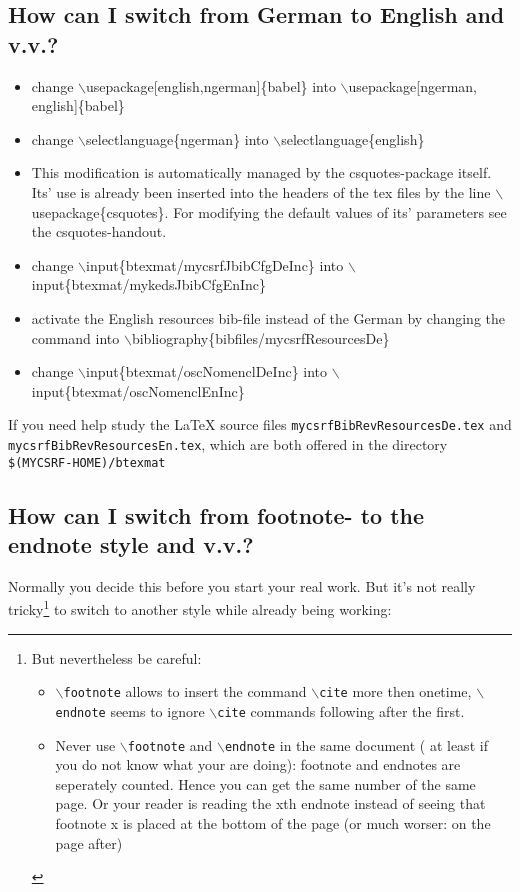 \documentclass[
  DIV=calc,
  BCOR=5mm,
  11pt,
  headings=small,
  oneside,
  abstract=true,
  toc=bib,
  ngerman,english]{scrartcl}
\begin{document}
\subsection{How can I switch from German to English and v.v.?}

\begin{itemize}
  \item change $\backslash$usepackage[english,ngerman]\{babel\} into
  $\backslash$usepackage[ngerman, english]\{babel\}
  \item change $\backslash$selectlanguage\{ngerman\} into 
  $\backslash$selectlanguage\{english\}
  \item This modification is automatically managed by the csquotes-package
  itself. Its' use is already been inserted into the headers of the tex
  files by the line $\backslash$usepackage\{csquotes\}. For modifying the
  default values of its' parameters see the csquotes-handout.
  \item change $\backslash$input\{btexmat/mycsrfJbibCfgDeInc\} into
  $\backslash$input\{btexmat/my\-keds\-Jbib\-CfgEnInc\}
  \item activate the English resources bib-file instead of the German by
  changing the command into $\backslash$bibliography\{bibfiles/mycsrfResourcesDe\}
  \item change $\backslash$input\{btexmat/osc\-Nomencl\-De\-Inc\} into
  $\backslash$input\{btexmat/osc\-Nomencl\-En\-Inc\}
\end{itemize}

If you need help study the LaTeX source files
\texttt{mycsrfBibRevResourcesDe.tex} and
\texttt{mycsrfBibRevResourcesEn.tex}, which are both offered in the directory
\texttt{\$(MYCSRF-HOME)/btexmat}

\subsection{How can I switch from footnote- to the endnote style and v.v.?}

Normally you decide this before you start your real work. But it's not
really tricky\footnote{
But nevertheless be careful: 
\begin{itemize}
  \item \texttt{$\backslash$footnote} allows to insert the command
  \texttt{$\backslash$cite} more then onetime, \texttt{$\backslash$endnote}
  seems to ignore \texttt{$\backslash$cite} commands following after the first.
  \item Never use \texttt{$\backslash$footnote} and \texttt{$\backslash$endnote}
  in the same document ( at least if you do not know what your are
  doing): footnote and endnotes are seperately counted. Hence you can get the
  same number of the same page. Or your reader is reading the xth endnote
  instead of seeing that footnote x is placed at the bottom of the page (or
  much worser: on the page after)
\end{itemize}} to switch to another style while already being working:
\end{document}
